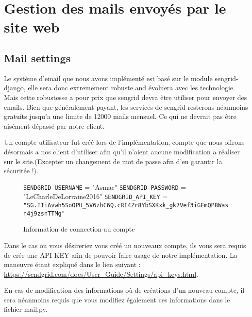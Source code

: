 \chapter{Gestion des mails envoyés par le site web}
\label{gestion des mails}

\section{Mail settings}

Le système d'email que nous avons implémenté est basé sur le module sengrid-django, 
elle sera donc extremement robuste and évoluera avec les technologie. Mais cette
robustesse a pour prix que sengrid devra être utiliser pour envoyer des emails.
Bien que généralement payant, les services de sengrid resterons néanmoins gratuits 
jusqu'a une limite de 12000 mails mensuel. Ce qui ne devrait pas être aisément dépassé
par notre client. \newline

Un compte utilisateur fut créé lors de l'implémentation, compte que nous offrons désormais
a nos client d'utiliser afin qu'il n'aient aucune modification a réaliser sur le site.(Excepter un changement de mot de passe afin d'en garantir la sécuritée !).  \newline

\begin{figure}[!ht]
	\begin{framed}
\verb|SENDGRID_USERNAME| = "Asmae" \newline
\verb|SENDGRID_PASSWORD| = "LeCharleDeLorraine2016" \newline
\verb|SENDGRID_API_KEY| = \newline \verb|"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"|
	\end{framed}
	\caption{Information de connection au compte}
	\label{fig:Architecture des dossiers}
\end{figure}
\FloatBarrier

Dans le cas ou vous désireriez vous créé un nouveaux compte, ils vous sera requis de 
crée une API KEY afin de pouvoir faire usage de notre implémentation. La maneuvre 
étant expliqué dans le lien suivant : 
\url{https://sendgrid.com/docs/User_Guide/Settings/api_keys.html}. \newline

En cas de modification des informations où de créations d'un nouveau compte, il sera
néanmoins requis que vous modifiez également ces informations dans le fichier mail.py.

